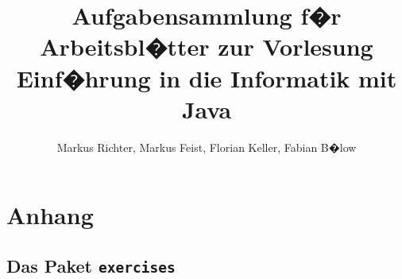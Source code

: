 \documentclass[a4paper,11pt,german]{book}
\title{Aufgabensammlung f�r Arbeitsbl�tter zur Vorlesung\\\glqq Einf�hrung in die Informatik mit Java\grqq}
\author{Markus Richter, Markus Feist, Florian Keller, Fabian B�low}
\begin{document}
\atendexercise{\newpage}

\maketitle

\tableofcontents

\newpage



\appendix

\part{Anhang}

\chapter{Das Paket \texttt{exercises}}

\end{document}
